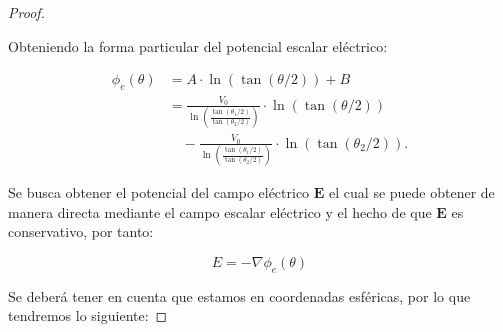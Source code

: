 \begin{proof}
\begin{itemize}
        Obteniendo la forma particular del potencial escalar eléctrico:
        
        \begin{equation}
            \begin{aligned}
                \phi_{e}(\theta) &= A\cdot \ln\left(\tan(\theta/2)\right) + B \\
                &= \frac{V_{0}}{\ln\left(\frac{\tan(\theta_{1}/2)}{\tan(\theta_{2}/2)}\right)} \cdot \ln\left(\tan(\theta/2)\right) \\
                &\quad - \frac{V_{0}}{\ln\left(\frac{\tan(\theta_{1}/2)}{\tan(\theta_{2}/2)}\right)} \cdot \ln\left(\tan(\theta_{2}/2)\right).
            \end{aligned}
        \end{equation}
    \end{itemize}
    \item Se busca obtener el potencial del campo eléctrico $\textbf{E}$ el cual se puede obtener de manera directa mediante el campo escalar eléctrico y el hecho de que $\textbf{E}$ es conservativo, por tanto:

    \begin{equation}
        E= - \nabla \phi_{e}(\theta)
    \end{equation}
    
    Se deberá tener en cuenta que estamos en coordenadas esféricas, por lo que tendremos lo siguiente:
    

\end{proof}
